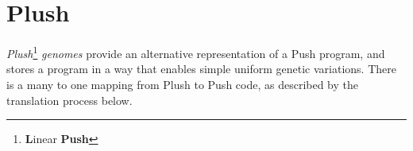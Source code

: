 \documentclass[graybox]{svmult}
\begin{document}
\section{Plush}
\textit{Plush}\footnote{\textbf{L}inear \textbf{Push}} \textit{genomes} provide
an alternative representation of a Push program, and stores a program in a way that enables simple uniform genetic variations. There is a many to one mapping from Plush to Push code, as described by the translation process below.





\end{document}
